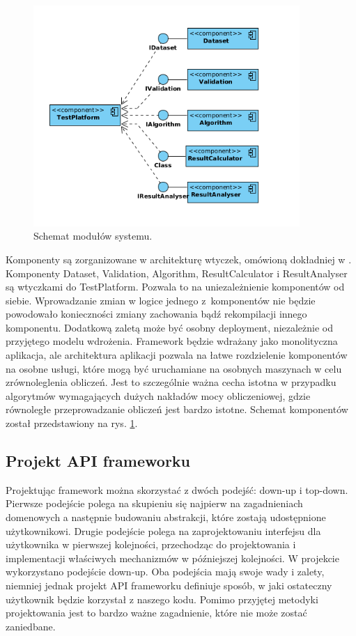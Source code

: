\documentclass[12pt]{article}
\begin{document}
\begin{figure}
\centering
	\includegraphics[width=0.9\textwidth]{img/ModulesDiagram.png}
	\caption{Schemat modułów systemu.}
	\label{fig:modules_diagram}
\end{figure}

Komponenty są zorganizowane w architekturę wtyczek, omówioną dokładniej w \cite{clean-arch}. Komponenty Dataset, Validation, Algorithm, ResultCalculator i ResultAnalyser są wtyczkami do TestPlatform. Pozwala to na uniezależnienie komponentów od siebie. Wprowadzanie zmian w logice jednego z~komponentów nie będzie powodowało konieczności zmiany zachowania bądź rekompilacji innego komponentu. Dodatkową zaletą może być osobny deployment, niezależnie od przyjętego modelu wdrożenia. Framework będzie wdrażany jako monolityczna aplikacja, ale architektura aplikacji pozwala na łatwe rozdzielenie komponentów na osobne usługi, które mogą być uruchamiane na osobnych maszynach w celu zrównoleglenia obliczeń. Jest to szczególnie ważna cecha istotna w przypadku algorytmów wymagających dużych nakładów mocy obliczeniowej, gdzie równoległe przeprowadzanie obliczeń jest bardzo istotne. Schemat komponentów został przedstawiony na rys. \ref{fig:modules_diagram}.


\subsection{Projekt API frameworku}
\label{ch:api}

Projektując framework można skorzystać z dwóch podejść: down-up i top-down. Pierwsze podejście polega na skupieniu się najpierw na zagadnieniach domenowych a następnie budowaniu abstrakcji, które zostają udostępnione użytkownikowi. Drugie podejście polega na zaprojektowaniu interfejsu dla użytkownika w pierwszej kolejności, przechodząc do projektowania i implementacji właściwych mechanizmów w późniejszej kolejności. W projekcie wykorzystano podejście down-up. Oba podejścia mają swoje wady i zalety, niemniej jednak projekt API frameworku definiuje sposób, w jaki ostateczny użytkownik będzie korzystał z naszego kodu. Pomimo przyjętej metodyki projektowania jest to bardzo ważne zagadnienie, które nie może zostać zaniedbane. 
\end{document}
